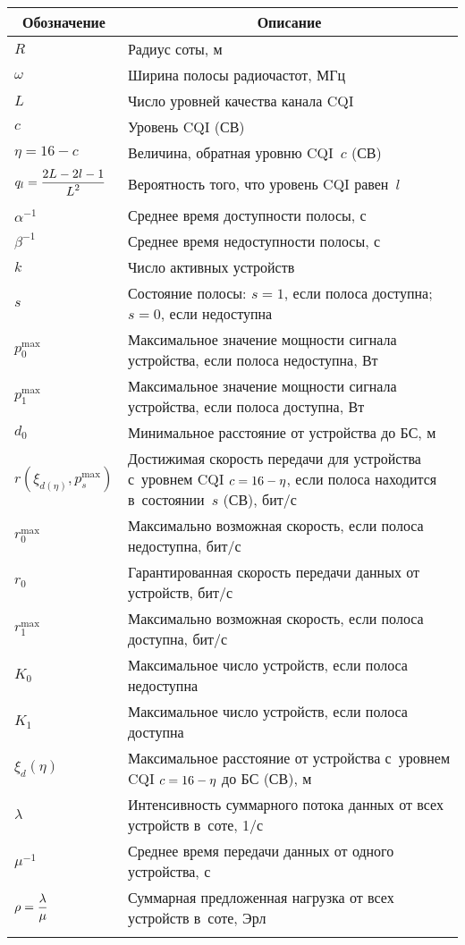   \begin{table*}\small
  \begin{center}
  \vspace*{2ex}
  
  \begin{tabular}{|l|p{340pt}|}
  \hline
  \multicolumn{1}{|c|}{Обозначение}&\multicolumn{1}{c|}{Описание}\\
  \hline
  $R$&Радиус соты, м\\
  $\omega$&Ширина полосы радиочастот, МГц\\
  $L$&Число уровней качества канала CQI \\
  $c$&Уровень CQI (СВ)\\
  $\eta=16-c$&Величина, обратная уровню CQI~$c$  (СВ)\\
  $q_l=\displaystyle\frac{\displaystyle 2L-2l-1\mathstrut}{\displaystyle L^2\mathstrut}$&Вероятность того, что уровень CQI равен~$l$\\
  $\alpha^{-1}$&Среднее время доступности полосы, с\\
  $\beta^{-1}$&Среднее время недоступности полосы, с\\
  $k$&Число активных устройств\\
  $s$&Состояние полосы: $s=1$, если полоса доступна; $s=0$, если недоступна\\
  $p_0^{\max}$&Максимальное значение мощности сигнала устройства, если полоса 
недоступна, Вт\\
  $p_1^{\max}$&Максимальное значение мощности сигнала устройства, если полоса 
доступна, Вт\\
  $d_0$&Минимальное расстояние от устройства до БС, м\\
  $r\left( \xi_{d(\eta)}, p_s^{\max}\right)$ &Достижимая скорость передачи 
  для устройства с~уровнем CQI $c\hm=16\hm-\eta$, если полоса находится в~состоянии~$s$ (СВ), бит/с\\
  $r_0^{\max}$&Максимально возможная скорость, если полоса недоступна, бит/с\\
  $r_0$&Гарантированная скорость передачи данных от устройств, бит/с\\
  $r_1^{\max}$&Максимально возможная скорость, если полоса доступна, бит/с\\
  $K_0$&Максимальное число устройств, если полоса недоступна\\
  $K_1$&Максимальное число устройств, если полоса доступна\\
  $\xi_d(\eta)$ &Максимальное расстояние от устройства с~уровнем CQI $c\hm=16\hm-\eta$ 
до БС (СВ), м\\
  $\lambda$&Интенсивность суммарного потока данных от всех устройств в~соте, 1/с\\
  $\mu^{-1}$&Среднее время передачи данных от одного устройства, с\\
  $\rho=\displaystyle\frac{\displaystyle \lambda\mathstrut}{\displaystyle \mu\mathstrut}$&Суммарная предложенная нагрузка от всех устройств в~соте, Эрл\\[-9pt]
&\\
  \hline
  \end{tabular}
  \end{center}
  \end{table*}
  
